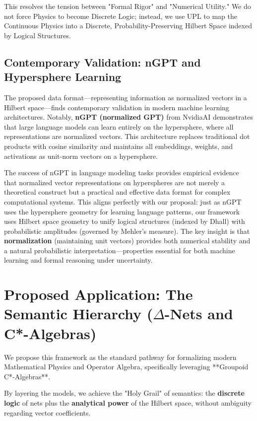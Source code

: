 \documentclass{stex}
\begin{document}
This resolves the tension between "Formal Rigor" and "Numerical Utility." We do not force Physics to become Discrete Logic; instead, we use UPL to map the Continuous Physics into a Discrete, Probability-Preserving Hilbert Space indexed by Logical Structures.

\subsection{Contemporary Validation: nGPT and Hypersphere Learning}

The proposed data format---representing information as normalized vectors in a Hilbert space---finds contemporary validation in modern machine learning architectures. Notably, \textbf{nGPT (normalized GPT)} from NvidiaAI demonstrates that large language models can learn entirely on the hypersphere, where all representations are normalized vectors. This architecture replaces traditional dot products with cosine similarity and maintains all embeddings, weights, and activations as unit-norm vectors on a hypersphere.

The success of nGPT in language modeling tasks provides empirical evidence that normalized vector representations on hyperspheres are not merely a theoretical construct but a practical and effective data format for complex computational systems. This aligns perfectly with our proposal: just as nGPT uses the hypersphere geometry for learning language patterns, our framework uses Hilbert space geometry to unify logical structures (indexed by Dhall) with probabilistic amplitudes (governed by Mehler's measure). The key insight is that \textbf{normalization} (maintaining unit vectors) provides both numerical stability and a natural probabilistic interpretation---properties essential for both machine learning and formal reasoning under uncertainty.

\section{Proposed Application: The Semantic Hierarchy ($\Delta$-Nets and C*-Algebras)}

We propose this framework as the standard pathway for formalizing modern Mathematical Physics and Operator Algebra, specifically leveraging **Groupoid C*-Algebras**.

By layering the models, we achieve the "Holy Grail" of semantics: the \textbf{discrete logic} of nets plus the \textbf{analytical power} of the Hilbert space, without ambiguity regarding vector coefficients.
\end{document}

